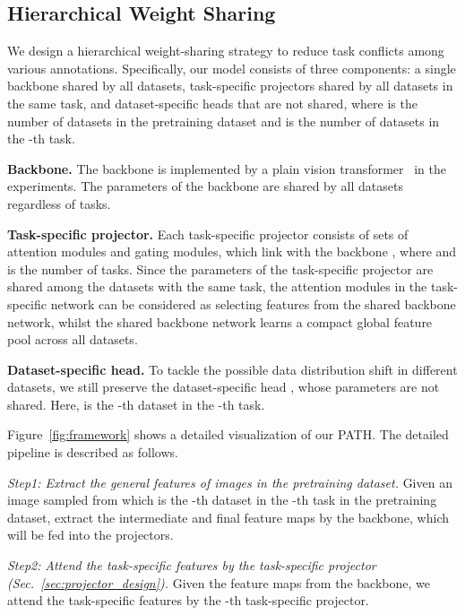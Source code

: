 \documentclass[10pt,twocolumn,letterpaper]{article}
\begin{document}
\subsection{Hierarchical Weight Sharing} \label{sec:hierarchical_weight_sharing}
We design a hierarchical weight-sharing strategy to reduce task conflicts among various annotations. Specifically, our model consists of three components: a single backbone shared by all datasets,  task-specific projectors shared by all datasets in the same task, and  dataset-specific heads that are not shared, where  is the number of datasets in the pretraining dataset and  is the number of datasets in the -th task. 

\noindent \textbf{Backbone.}
The backbone  is implemented by a plain vision transformer~\cite{dosovitskiy2020image} in the experiments. The parameters of the backbone are shared by all datasets regardless of tasks. 

\noindent \textbf{Task-specific projector.}
Each task-specific projector  consists of sets of attention modules and gating modules, which link with the backbone , where  and  is the number of tasks. Since the parameters of the task-specific projector are shared among the datasets with the same task, the attention modules in the task-specific network can be considered as selecting features from the shared backbone network, whilst the shared backbone network learns a compact global feature pool across all datasets. 

\noindent \textbf{Dataset-specific head.} To tackle the possible data distribution shift in different datasets, we still preserve the dataset-specific head , whose parameters are not shared. Here,  is the -th dataset in the -th task.





Figure~\ref{fig:framework} shows a detailed visualization of our PATH. The detailed pipeline is described as follows.

\emph{Step1: Extract the general features of images in the pretraining dataset.} Given an image  sampled from  which is the -th dataset in the -th task in the pretraining dataset, extract the intermediate and final feature maps  by the backbone, which will be fed into the projectors. 

\emph{Step2:} \emph{Attend the task-specific features by the task-specific projector (Sec.~\ref{sec:projector_design}).} Given the feature maps  from the backbone, we attend the task-specific features  by the -th task-specific projector.
\end{document}
